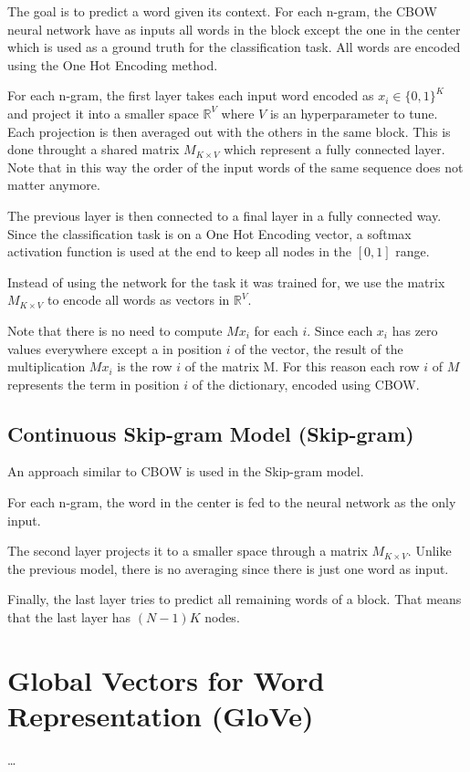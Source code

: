 The goal is to predict a word given its context.
For each n-gram, the CBOW neural network have as inputs all words in the block
except the one in the center which is used as a ground truth for the classification task.
All words are encoded using the One Hot Encoding method.

For each n-gram, the first layer takes each input word encoded as $x_i \in \{0, 1\}^K$ and project it into a smaller space $\mathbb{R}^V$
where $V$ is an hyperparameter to tune.
Each projection is then averaged out with the others in the same block.
This is done throught a shared matrix $M_{K \times V}$ which represent a fully connected layer.
Note that in this way the order of the input words of the same sequence does not matter anymore.

The previous layer is then connected to a final layer in a fully connected way.
Since the classification task is on a One Hot Encoding vector,
a softmax activation function is used at the end to keep all nodes in the $[0, 1]$ range.

Instead of using the network for the task it was trained for, we use the matrix $M_{K \times V}$ to encode all words as vectors in $\mathbb{R}^V$.

Note that there is no need to compute $M x_i$ for each $i$.
Since each $x_i$ has zero values everywhere except a  in position $i$ of the vector, the result of the multiplication $M x_i$ is the row $i$ of the matrix M.
For this reason each row $i$ of $M$ represents the term in position $i$ of the dictionary, encoded using CBOW.

\subsection{Continuous Skip-gram Model (Skip-gram)}
An approach similar to CBOW is used in the Skip-gram model.

For each n-gram, the word in the center is fed to the neural network as the only input.

The second layer projects it to a smaller space through a matrix $M_{K \times V}$.
Unlike the previous model, there is no averaging since there is just one word as input.

Finally, the last layer tries to predict all remaining words of a block.
That means that the last layer has $(N-1)K$ nodes.

\section{Global Vectors for Word Representation (GloVe)}
\dots